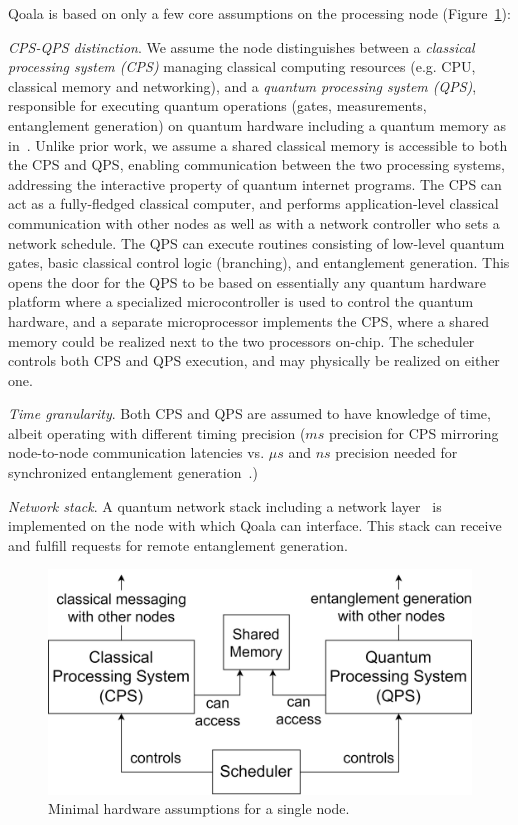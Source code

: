 Qoala is based on only a few core assumptions on the processing node (Figure~\ref{fig:minimal_hardware_assumptions}):

\textit{CPS-QPS distinction}. We assume the node distinguishes between a \textit{classical processing system (CPS)} managing classical computing resources (e.g. CPU, classical memory and networking), and a \textit{quantum processing system (QPS)}, responsible for executing quantum operations (gates, measurements, entanglement generation) on quantum hardware including a quantum memory as in~\cite{dahlberg2022netqasm, pompili2022experimental}.
Unlike prior work, we assume a shared classical memory is accessible to both the CPS and QPS, enabling communication between the two processing systems, addressing the interactive property of quantum internet programs.
The CPS can act as a fully-fledged classical computer, and performs application-level classical communication with other nodes as well as with a network controller who sets a network schedule.
The QPS can execute routines consisting of low-level quantum gates, basic classical control logic (branching), and entanglement generation.
This opens the door for the QPS to be based on essentially any quantum hardware platform where a specialized microcontroller is used to control the quantum hardware, and a separate microprocessor implements the CPS, where a shared memory could be realized next to the two processors on-chip.
The scheduler controls both CPS and QPS execution, and may physically be realized on either one.

\textit{Time granularity}. Both CPS and QPS are assumed to have knowledge of time, albeit operating with different timing precision ($ms$ precision for CPS mirroring node-to-node communication latencies vs. $\mu s$ and $ns$ precision needed for synchronized entanglement generation~\cite{pompili2022experimental, dahlberg2019link}.)

 \textit{Network stack}. A quantum network stack including a network layer~\cite{dahlberg2019link} is implemented on the node with which Qoala can interface. This stack can receive and fulfill requests for remote entanglement generation.
\begin{figure}
    \centering
    \includegraphics[width=\columnwidth]{figures/qoala/minimal-hardware.png}
    \caption{Minimal hardware assumptions for a single node.}
    \label{fig:minimal_hardware_assumptions}
\end{figure}



